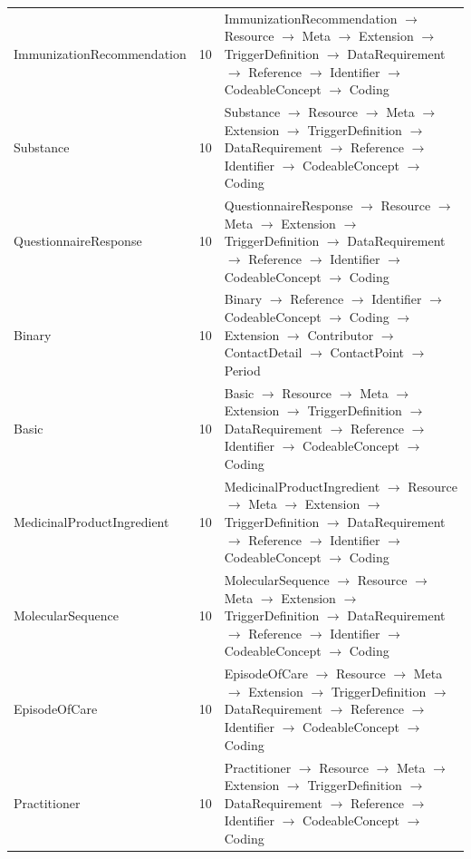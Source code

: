 \begin{longtable}{lrl}
ImmunizationRecommendation & 10 & ImmunizationRecommendation $\rightarrow$ Resource $\rightarrow$ Meta $\rightarrow$ Extension $\rightarrow$ TriggerDefinition $\rightarrow$ DataRequirement $\rightarrow$ Reference $\rightarrow$ Identifier $\rightarrow$ CodeableConcept $\rightarrow$ Coding \\
Substance & 10 & Substance $\rightarrow$ Resource $\rightarrow$ Meta $\rightarrow$ Extension $\rightarrow$ TriggerDefinition $\rightarrow$ DataRequirement $\rightarrow$ Reference $\rightarrow$ Identifier $\rightarrow$ CodeableConcept $\rightarrow$ Coding \\
QuestionnaireResponse & 10 & QuestionnaireResponse $\rightarrow$ Resource $\rightarrow$ Meta $\rightarrow$ Extension $\rightarrow$ TriggerDefinition $\rightarrow$ DataRequirement $\rightarrow$ Reference $\rightarrow$ Identifier $\rightarrow$ CodeableConcept $\rightarrow$ Coding \\
Binary & 10 & Binary $\rightarrow$ Reference $\rightarrow$ Identifier $\rightarrow$ CodeableConcept $\rightarrow$ Coding $\rightarrow$ Extension $\rightarrow$ Contributor $\rightarrow$ ContactDetail $\rightarrow$ ContactPoint $\rightarrow$ Period \\
Basic & 10 & Basic $\rightarrow$ Resource $\rightarrow$ Meta $\rightarrow$ Extension $\rightarrow$ TriggerDefinition $\rightarrow$ DataRequirement $\rightarrow$ Reference $\rightarrow$ Identifier $\rightarrow$ CodeableConcept $\rightarrow$ Coding \\
MedicinalProductIngredient & 10 & MedicinalProductIngredient $\rightarrow$ Resource $\rightarrow$ Meta $\rightarrow$ Extension $\rightarrow$ TriggerDefinition $\rightarrow$ DataRequirement $\rightarrow$ Reference $\rightarrow$ Identifier $\rightarrow$ CodeableConcept $\rightarrow$ Coding \\
MolecularSequence & 10 & MolecularSequence $\rightarrow$ Resource $\rightarrow$ Meta $\rightarrow$ Extension $\rightarrow$ TriggerDefinition $\rightarrow$ DataRequirement $\rightarrow$ Reference $\rightarrow$ Identifier $\rightarrow$ CodeableConcept $\rightarrow$ Coding \\
EpisodeOfCare & 10 & EpisodeOfCare $\rightarrow$ Resource $\rightarrow$ Meta $\rightarrow$ Extension $\rightarrow$ TriggerDefinition $\rightarrow$ DataRequirement $\rightarrow$ Reference $\rightarrow$ Identifier $\rightarrow$ CodeableConcept $\rightarrow$ Coding \\
Practitioner & 10 & Practitioner $\rightarrow$ Resource $\rightarrow$ Meta $\rightarrow$ Extension $\rightarrow$ TriggerDefinition $\rightarrow$ DataRequirement $\rightarrow$ Reference $\rightarrow$ Identifier $\rightarrow$ CodeableConcept $\rightarrow$ Coding \\

\end{longtable}
